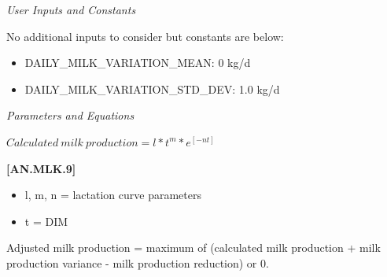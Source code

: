 \documentclass{article}
\begin{document}
\begin{refsection}
\begin{enumerate}
         \textit{User Inputs and Constants}
         \vspace{0.1cm}

         No additional inputs to consider but constants are below: 
        \begin{itemize}
            \item DAILY\_MILK\_VARIATION\_MEAN: 0 kg/d
            \item DAILY\_MILK\_VARIATION\_STD\_DEV: 1.0 kg/d 
        \end{itemize}

         \textit{Parameters and Equations}
         \vspace{0.1cm}

    \begin{center}
\(Calculated\ milk\ production = l*t^m *e^{[-nt]}\)
    \end{center}
        \vspace{0.5cm} 
    
            {\raggedleft \textbf{[AN.MLK.9]}\par}
            \vspace{0.2cm}

        \begin{itemize}
            \item l, m, n = lactation curve parameters
            \item t = DIM
        \end{itemize}
        \vspace{0.2cm}

        \begin{tcolorbox}[colback=white, colframe=black, boxrule=0.5pt, arc=3pt, width=\textwidth]
            Adjusted milk production = maximum of (calculated milk production + milk production variance - milk production reduction) or 0.
        \end{tcolorbox}
        \vspace{0.2cm}


\end{enumerate}
\end{refsection}
\end{document}
